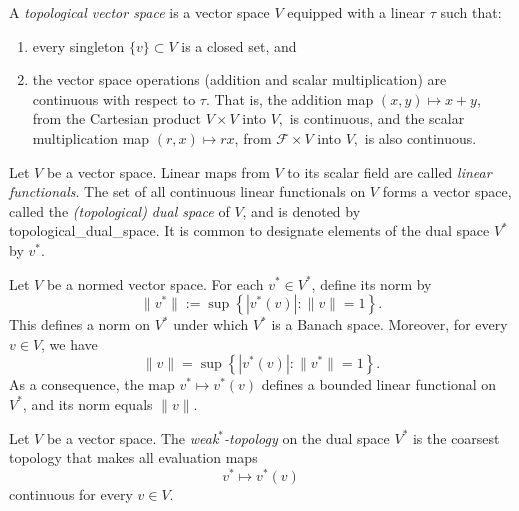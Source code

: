 
\begin{definition}
A \emph{topological vector space} is a vector space \( V \) equipped with a linear \( \tau \) such that:
\begin{enumerate}
    \item every singleton \( \{v\} \subset V \) is a closed set, and
    \item the vector space operations (addition and scalar multiplication) are continuous with respect to \( \tau \).  That is, the addition map \( (x, y) \mapsto x + y \), from the Cartesian product \( V \times V \) into \( V, \) is continuous, and the scalar multiplication map \( (r, x) \mapsto r x \), from \( \mathcal{F} \times V \) into \( V, \) is also continuous.
\end{enumerate}

\end{definition}

\begin{definition}
  Let $V$ be a vector space. 
  Linear maps from $V$ to its scalar field are called \emph{linear functionals}. The set of all continuous linear functionals on $V$ forms a vector space, called the \emph{(topological) dual space} of $ V $, and is denoted by  \gls{topological_dual_space}. It is common to designate elements of the dual space  $V^*$  by \( v^* \).  %
\end{definition}



\begin{theorem} \cite[Theorem 4.3]{rudin91functional} %
Let \( V \) be a normed vector space. For each \( v^* \in V^* \), define its norm by
\[
\|v^*\| := \sup \left\{ | v^*(v) | : \|v\| = 1 \right\}.
\]
This defines a norm on \( V^* \) under which \( V^* \) is a Banach space. Moreover, for every \( v \in V \), we have
\[
\|v\| = \sup \left\{ | v^*(v) | : \|v^*\| = 1 \right\}.
\]
As a consequence, the map \( v^* \mapsto v^*(v)  \) defines a bounded linear functional on \( V^* \), and its norm equals \( \|v\| \).
\end{theorem}

\begin{definition} \label{def:weak*_top}
Let \( V \) be a vector space. The \emph{weak\(^*\)-topology} on the dual space \( V^* \) is the coarsest topology that makes all evaluation maps
\[
v^* \mapsto v^*(v) 
\]
continuous for every \( v \in V \).
\end{definition}




